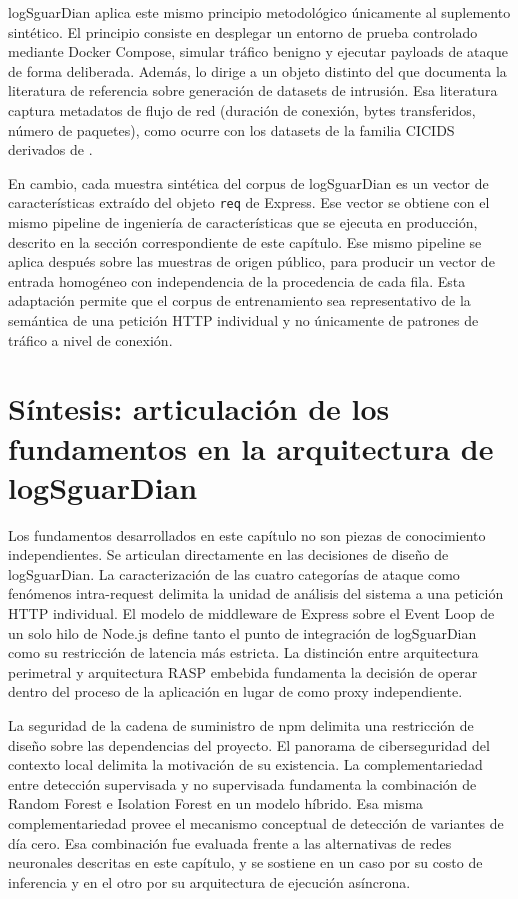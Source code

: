 logSguarDian aplica este mismo principio metodológico únicamente al suplemento sintético. El principio consiste en desplegar un entorno de prueba controlado mediante Docker Compose, simular tráfico benigno y ejecutar payloads de ataque de forma deliberada. Además, lo dirige a un objeto distinto del que documenta la literatura de referencia sobre generación de datasets de intrusión. Esa literatura captura metadatos de flujo de red (duración de conexión, bytes transferidos, número de paquetes), como ocurre con los datasets de la familia CICIDS derivados de \textcite{shiravi2012}.

En cambio, cada muestra sintética del corpus de logSguarDian es un vector de características extraído del objeto \texttt{req} de Express. Ese vector se obtiene con el mismo pipeline de ingeniería de características que se ejecuta en producción, descrito en la sección correspondiente de este capítulo. Ese mismo pipeline se aplica después sobre las muestras de origen público, para producir un vector de entrada homogéneo con independencia de la procedencia de cada fila. Esta adaptación permite que el corpus de entrenamiento sea representativo de la semántica de una petición HTTP individual y no únicamente de patrones de tráfico a nivel de conexión.

\section{Síntesis: articulación de los fundamentos en la arquitectura de logSguarDian}

Los fundamentos desarrollados en este capítulo no son piezas de conocimiento independientes. Se articulan directamente en las decisiones de diseño de logSguarDian. La caracterización de las cuatro categorías de ataque como fenómenos intra-request delimita la unidad de análisis del sistema a una petición HTTP individual. El modelo de middleware de Express sobre el Event Loop de un solo hilo de Node.js define tanto el punto de integración de logSguarDian como su restricción de latencia más estricta. La distinción entre arquitectura perimetral y arquitectura RASP embebida fundamenta la decisión de operar dentro del proceso de la aplicación en lugar de como proxy independiente.

La seguridad de la cadena de suministro de npm delimita una restricción de diseño sobre las dependencias del proyecto. El panorama de ciberseguridad del contexto local delimita la motivación de su existencia. La complementariedad entre detección supervisada y no supervisada fundamenta la combinación de Random Forest e Isolation Forest en un modelo híbrido. Esa misma complementariedad provee el mecanismo conceptual de detección de variantes de día cero. Esa combinación fue evaluada frente a las alternativas de redes neuronales descritas en este capítulo, y se sostiene en un caso por su costo de inferencia y en el otro por su arquitectura de ejecución asíncrona.

